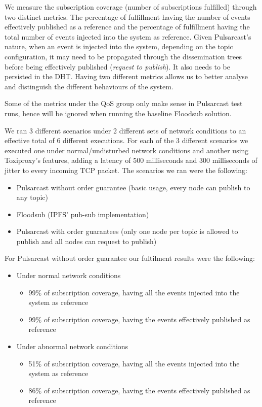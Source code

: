 We measure the subscription coverage (number of subscriptions fulfilled)
through two distinct metrics. The percentage of fulfillment having the number
of events effectively published as a reference and the percentage of
fulfillment having the total number of events injected into the system as
reference. Given Pulsarcast's nature, when an event is injected into the
system, depending on the topic configuration, it may need to be propagated
through the dissemination trees before being effectively published
(\emph{request to publish}). It also needs to be persisted in the DHT. Having
two different metrics allows us to better analyse and distinguish the different
behaviours of the system.

Some of the metrics under the QoS group only make sense in Pulsarcast test
runs, hence will be ignored when running the baseline Floodsub solution.

We ran 3 different scenarios under 2 different sets of network conditions to an
effective total of 6 different executions. For each of the 3 different
scenarios we executed one under normal/undisturbed network conditions and
another using Toxiproxy's features, adding a latency of 500 milliseconds and
300 milliseconds of jitter to every incoming TCP packet. The scenarios we ran
were the following:

\begin{itemize}
  \item Pulsarcast without order guarantee (basic usage, every node can publish to any topic)
  \item Floodsub (IPFS' pub-sub implementation)
  \item Pulsarcast with order guarantees (only one node per topic is allowed to publish and all nodes can request to publish)
\end{itemize}

For Pulsarcast without order guarantee our fultilment results were the following:
\begin{itemize}
\item Under normal network conditions
\begin{itemize}
  \item 99\% of subscription coverage, having all the events injected into the system as reference
  \item 99\% of subscription coverage, having the events effectively published as reference
\end{itemize}
\item Under abnormal network conditions
\begin{itemize}
  \item 51\% of subscription coverage, having all the events injected into the system as reference
  \item 86\% of subscription coverage, having the events effectively published as reference
\end{itemize}
\end{itemize}

